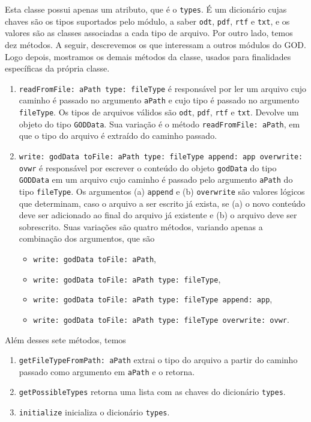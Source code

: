 Esta classe possui apenas um atributo, que é o \verb|types|. É um
dicionário cujas chaves são os tipos suportados pelo módulo, a saber
\verb|odt|, \verb|pdf|, \verb|rtf| e \verb|txt|, e os valores são as
classes associadas a cada tipo de arquivo. Por outro lado, temos dez
métodos. A seguir, descrevemos os que interessam a outros módulos do
GOD. Logo depois, mostramos os demais métodos da classe, usados para
finalidades específicas da própria classe.
\begin{enumerate}

\item \verb|readFromFile: aPath type: fileType| é responsável por ler
  um arquivo cujo caminho é passado no argumento \verb|aPath| e cujo
  tipo é passado no argumento \verb|fileType|. Os tipos de arquivos
  válidos são \verb|odt|, \verb|pdf|, \verb|rtf| e \verb|txt|. Devolve
  um objeto do tipo \verb|GODData|. Sua variação é o método
  \verb|readFromFile: aPath|, em que o tipo do arquivo é extraído do
  caminho passado.

\item
  \verb|write: godData toFile: aPath type: fileType append: app overwrite: ovwr|
  é responsável por escrever o conteúdo do objeto \verb|godData| do
  tipo \verb|GODData| em um arquivo cujo caminho é passado pelo
  argumento \verb|aPath| do tipo \verb|fileType|. Os argumentos (a)
  \verb|append| e (b) \verb|overwrite| são valores lógicos que
  determinam, caso o arquivo a ser escrito já exista, se (a) o novo
  conteúdo deve ser adicionado ao final do arquivo já existente e (b)
  o arquivo deve ser sobrescrito. Suas variações são quatro métodos,
  variando apenas a combinação dos argumentos, que são
  \begin{itemize}

  \item \verb|write: godData toFile: aPath|,
  \item \verb|write: godData toFile: aPath type: fileType|,
  \item \verb|write: godData toFile: aPath type: fileType append: app|,
  \item \verb|write: godData toFile: aPath type: fileType overwrite: ovwr|.

  \end{itemize}

\end{enumerate}

Além desses sete métodos, temos
\begin{enumerate}

\item \verb|getFileTypeFromPath: aPath| extrai o tipo do arquivo a
  partir do caminho passado como argumento em \verb|aPath| e o
  retorna.

\item \verb|getPossibleTypes| retorna uma lista com as chaves do
  dicionário \verb|types|.

\item \verb|initialize| inicializa o dicionário \verb|types|.

\end{enumerate}

